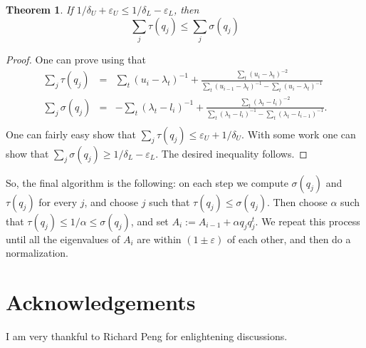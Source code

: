 \documentclass[12pt]{article}
\newcommand{\eps}{\varepsilon}
\newtheorem{theorem}{Theorem}
\begin{document}
    \begin{theorem}
        If $1 / \delta_U + \eps_U \leq 1 / \delta_L - \eps_L$, then
        $$
            \sum_j \tau(q_j) \leq \sum_j \sigma(q_j)
        $$
    \end{theorem}
    \begin{proof}
        One can prove using that
        \begin{eqnarray*}
            \sum_j \tau(q_j) &=& \sum_{t}(u_i - \lambda_t)^{-1} + \frac{\sum_t(u_i - \lambda_t)^{-2}}
            {\sum_t (u_{i-1} - \lambda_t)^{-1} - \sum_t (u_i - \lambda_t)^{-1}}\\
            \sum_j \sigma(q_j) &=& -\sum_t(\lambda_t - l_i)^{-1} + \frac{\sum_t(\lambda_t - l_i)^{-2}}
            {\sum_t(\lambda_t - l_i)^{-1} - \sum_t(\lambda_t - l_{i-1})^{-1}}.\\
        \end{eqnarray*}
        One can fairly easy show that $\sum_j \tau(q_j) \leq \eps_U + 1 / \delta_U$. With some work
        one can show that $\sum_j \sigma(q_j) \geq 1 / \delta_L - \eps_L$. The desired inequality follows.
    \end{proof}

    So, the final algorithm is the following: on each step we compute $\sigma(q_j)$ and $\tau(q_j)$ for every
    $j$, and choose $j$ such that $\tau(q_j) \leq \sigma(q_j)$. Then choose $\alpha$ such that
    $\tau(q_j) \leq 1 / \alpha \leq \sigma(q_j)$, and set $A_i := A_{i-1} + \alpha q_j q_j^t$.
    We repeat this process until all the eigenvalues of $A_i$ are within $(1 \pm \eps)$ of each other, and then do a
    normalization.

    \section{Acknowledgements}

    I am very thankful to Richard Peng for enlightening discussions.
    
    
\end{document}
